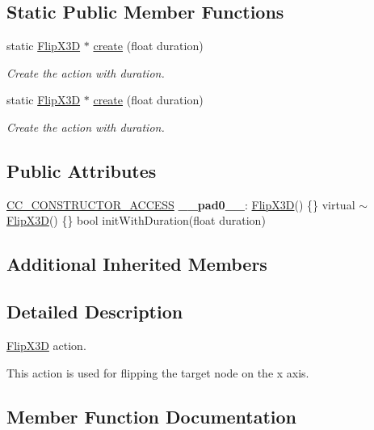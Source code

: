 \subsection*{Static Public Member Functions}
\begin{DoxyCompactItemize}
\item 
static \hyperlink{classFlipX3D}{Flip\+X3D} $\ast$ \hyperlink{classFlipX3D_ac52365b40a986e1a7250e7018cf6eee3}{create} (float duration)
\begin{DoxyCompactList}\small\item\em Create the action with duration. \end{DoxyCompactList}\item 
static \hyperlink{classFlipX3D}{Flip\+X3D} $\ast$ \hyperlink{classFlipX3D_a9905d9a2b1772e5c399f5efaf1272313}{create} (float duration)
\begin{DoxyCompactList}\small\item\em Create the action with duration. \end{DoxyCompactList}\end{DoxyCompactItemize}
\subsection*{Public Attributes}
\begin{DoxyCompactItemize}
\item 
\mbox{\label{classFlipX3D_a33893c2bcc4108a614250aee19ecb128}} 
\hyperlink{_2cocos2d_2cocos_2base_2ccConfig_8h_a25ef1314f97c35a2ed3d029b0ead6da0}{C\+C\+\_\+\+C\+O\+N\+S\+T\+R\+U\+C\+T\+O\+R\+\_\+\+A\+C\+C\+E\+SS} {\bfseries \+\_\+\+\_\+pad0\+\_\+\+\_\+}\+: \hyperlink{classFlipX3D}{Flip\+X3D}() \{\} virtual $\sim$\hyperlink{classFlipX3D}{Flip\+X3D}() \{\} bool init\+With\+Duration(float duration)
\end{DoxyCompactItemize}
\subsection*{Additional Inherited Members}


\subsection{Detailed Description}
\hyperlink{classFlipX3D}{Flip\+X3D} action. 

This action is used for flipping the target node on the x axis. 

\subsection{Member Function Documentation}
\mbox{\label{classFlipX3D_a3c8f037e07f76fbccb63a960c763a947}} 
